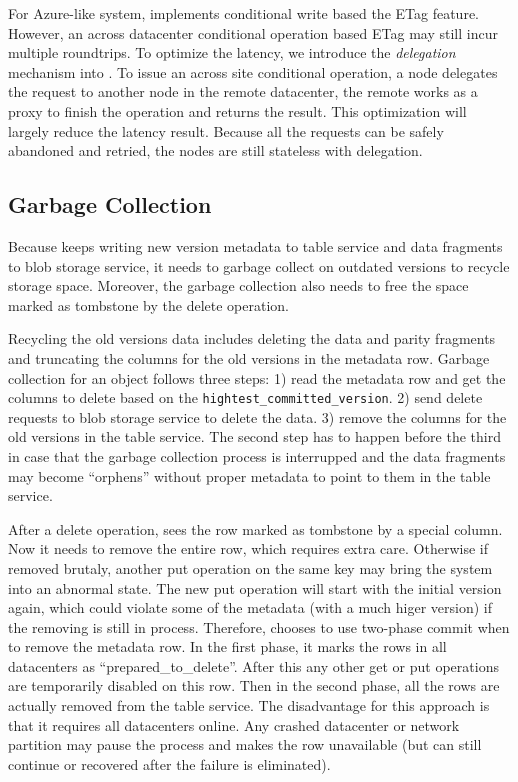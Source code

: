 For Azure-like system, {\name} implements conditional write based the ETag feature.
However, an across datacenter conditional operation based ETag may still incur multiple
roundtrips. To optimize the latency, we introduce the \emph{delegation} mechanism
into {\name}. To issue an across site conditional operation, a {\name} node delegates the
request to another {\name} node in the remote datacenter, the remote {\name} works as
a proxy to finish the operation and returns the result. This optimization will largely
reduce the latency result. Because all the requests can be safely abandoned and retried,
the {\name} nodes are still stateless with delegation.

\subsection{Garbage Collection}
Because {\giza} keeps writing new version metadata to table service and data fragments
to blob storage service, it needs to garbage collect on outdated versions to recycle
storage space. Moreover, the garbage collection also needs to free the space marked as
tombstone by the delete operation.

Recycling the old versions data includes deleting the data and parity fragments and
truncating the columns for the old versions in the metadata row. Garbage collection
for an object follows three steps: 1) read the metadata row and get the columns to
delete based on the \texttt{hightest\_committed\_version}. 2) send delete requests to
blob storage service to delete the data. 3) remove the columns for the old versions
in the table service. The second step has to happen before the third in case that the
garbage collection process is interrupped and the data fragments may become ``orphens''
without proper metadata to point to them in the table service.

After a delete operation, {\name} sees the row marked as tombstone by a special column.
Now it needs to remove the entire row, which requires extra care. Otherwise if removed
brutaly, another put operation on the same key may bring the system into an abnormal
state. The new put operation will start with the initial version again, which could
violate some of the metadata (with a much higer version) if the removing is still in
process. Therefore, {\name} chooses to use two-phase commit when to remove the metadata
row. In the first phase, it marks the rows in all datacenters as ``prepared_to_delete''.
After this any other get or put operations are temporarily disabled on this row. Then
in the second phase, all the rows are actually removed from the table service. The
disadvantage for this approach is that it requires all datacenters online. Any crashed
datacenter or network partition may pause the process and makes the row unavailable
(but can still continue or recovered after the failure is eliminated). 


